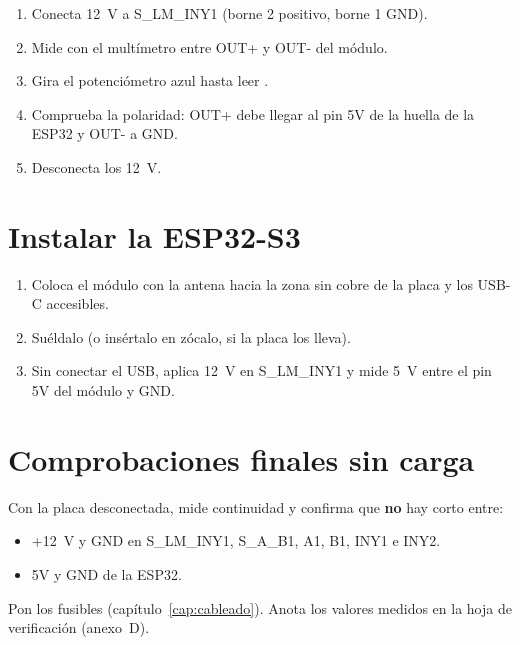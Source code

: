 \begin{enumerate}
\item Conecta 12~V a S\_LM\_INY1 (borne 2 positivo, borne 1 GND).
\item Mide con el multímetro entre OUT+ y OUT- del módulo.
\item Gira el potenciómetro azul hasta leer .
\item Comprueba la polaridad: OUT+ debe llegar al pin 5V de la huella de la ESP32 y OUT- a GND.
\item Desconecta los 12~V.
\end{enumerate}


\section{Instalar la ESP32-S3}

\begin{enumerate}
\item Coloca el módulo con la antena hacia la zona sin cobre de la placa y los USB-C accesibles.
\item Suéldalo (o insértalo en zócalo, si la placa los lleva).
\item Sin conectar el USB, aplica 12~V en S\_LM\_INY1 y mide 5~V entre el pin 5V del módulo y GND.
\end{enumerate}




\section{Comprobaciones finales sin carga}

Con la placa desconectada, mide continuidad y confirma que \textbf{no} hay corto entre:
\begin{itemize}
\item +12~V y GND en S\_LM\_INY1, S\_A\_B1, A1, B1, INY1 e INY2.
\item 5V y GND de la ESP32.
\end{itemize}
Pon los fusibles (capítulo~\ref{cap:cableado}). Anota los valores medidos en la hoja de verificación (anexo~D).
